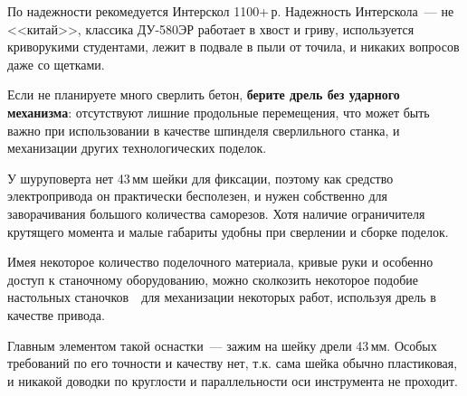 По надежности рекомедуется Интерскол 1100+\,р. Надежность Интерскола\ --- не
<<китай>>, классика ДУ-580ЭР работает в хвост и гриву, используется криворукими
студентами, лежит в подвале в пыли от точила, и никаких вопросов даже со
щетками.

Если не планируете много сверлить бетон, \textbf{берите дрель без ударного
механизма}: отсутствуют лишние продольные перемещения, что может быть важно при
использовании в качестве шпинделя сверлильного станка, и механизации других
технологических поделок.

У шуруповерта нет 43\,мм шейки для фиксации, поэтому как средство электропривода
он практически бесполезен, и нужен собственно для заворачивания большого
количества саморезов. Хотя наличие ограничителя крутящего момента и малые
габариты удобны при сверлении и сборке поделок.

\bigskip
Имея некоторое количество поделочного материала, кривые руки и особенно доступ к
станочному оборудованию, можно сколкозить некоторое подобие настольных
станочков\ \ для механизации некоторых работ,
используя дрель в качестве привода.

Главным элементом такой оснастки\ --- зажим на шейку дрели 43\,мм. Особых
требований по его точности и качеству нет, т.к. сама шейка обычно пластиковая, и
никакой доводки по круглости и параллельности оси инструмента не проходит.

